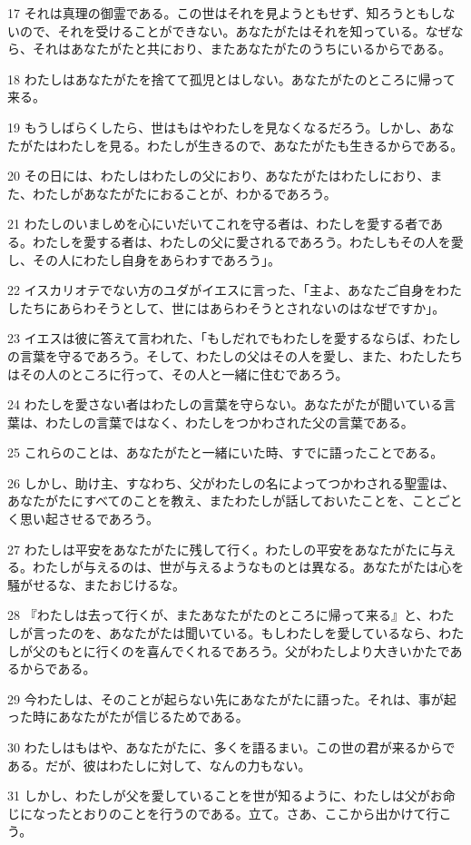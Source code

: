 \par 17 それは真理の御霊である。この世はそれを見ようともせず、知ろうともしないので、それを受けることができない。あなたがたはそれを知っている。なぜなら、それはあなたがたと共におり、またあなたがたのうちにいるからである。
\par 18 わたしはあなたがたを捨てて孤児とはしない。あなたがたのところに帰って来る。
\par 19 もうしばらくしたら、世はもはやわたしを見なくなるだろう。しかし、あなたがたはわたしを見る。わたしが生きるので、あなたがたも生きるからである。
\par 20 その日には、わたしはわたしの父におり、あなたがたはわたしにおり、また、わたしがあなたがたにおることが、わかるであろう。
\par 21 わたしのいましめを心にいだいてこれを守る者は、わたしを愛する者である。わたしを愛する者は、わたしの父に愛されるであろう。わたしもその人を愛し、その人にわたし自身をあらわすであろう」。
\par 22 イスカリオテでない方のユダがイエスに言った、「主よ、あなたご自身をわたしたちにあらわそうとして、世にはあらわそうとされないのはなぜですか」。
\par 23 イエスは彼に答えて言われた、「もしだれでもわたしを愛するならば、わたしの言葉を守るであろう。そして、わたしの父はその人を愛し、また、わたしたちはその人のところに行って、その人と一緒に住むであろう。
\par 24 わたしを愛さない者はわたしの言葉を守らない。あなたがたが聞いている言葉は、わたしの言葉ではなく、わたしをつかわされた父の言葉である。
\par 25 これらのことは、あなたがたと一緒にいた時、すでに語ったことである。
\par 26 しかし、助け主、すなわち、父がわたしの名によってつかわされる聖霊は、あなたがたにすべてのことを教え、またわたしが話しておいたことを、ことごとく思い起させるであろう。
\par 27 わたしは平安をあなたがたに残して行く。わたしの平安をあなたがたに与える。わたしが与えるのは、世が与えるようなものとは異なる。あなたがたは心を騒がせるな、またおじけるな。
\par 28 『わたしは去って行くが、またあなたがたのところに帰って来る』と、わたしが言ったのを、あなたがたは聞いている。もしわたしを愛しているなら、わたしが父のもとに行くのを喜んでくれるであろう。父がわたしより大きいかたであるからである。
\par 29 今わたしは、そのことが起らない先にあなたがたに語った。それは、事が起った時にあなたがたが信じるためである。
\par 30 わたしはもはや、あなたがたに、多くを語るまい。この世の君が来るからである。だが、彼はわたしに対して、なんの力もない。
\par 31 しかし、わたしが父を愛していることを世が知るように、わたしは父がお命じになったとおりのことを行うのである。立て。さあ、ここから出かけて行こう。

